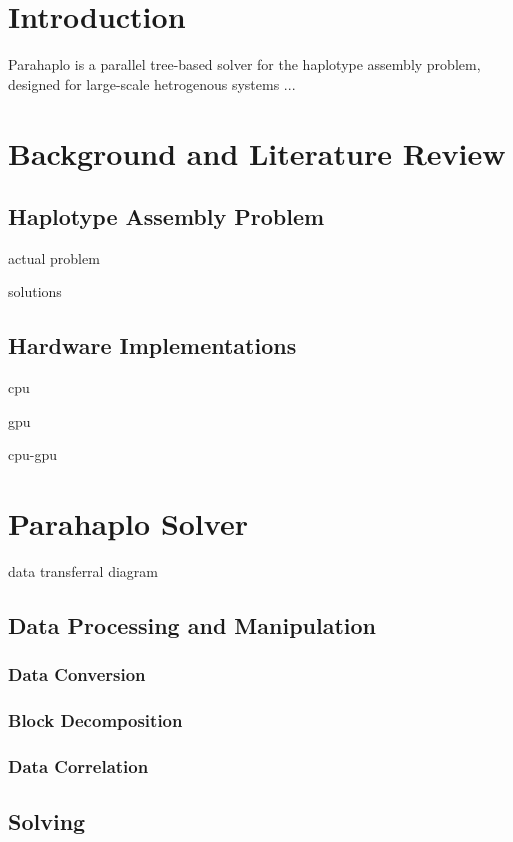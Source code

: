 \documentclass[10pt, conference, compsocconf]{IEEEtran}
\begin{document}
 
\section{Introduction} 
Parahaplo is a parallel tree-based solver for the haplotype assembly problem, designed for large-scale
hetrogenous systems ...

 
\section{Background and Literature Review} 

\subsection{Haplotype Assembly Problem}

actual problem

solutions

\subsection{Hardware Implementations}
cpu

gpu 

cpu-gpu
\section{Parahaplo Solver}
data transferral diagram

\subsection{Data Processing and Manipulation}

\subsubsection{Data Conversion}

\subsubsection{Block Decomposition}

\subsubsection{Data Correlation}

\subsection{Solving}
\end{document}
